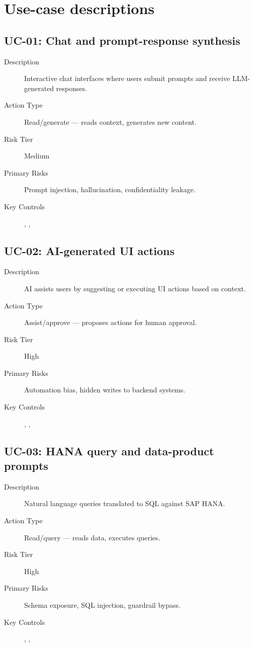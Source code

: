 \section{Use-case descriptions}

\subsection{UC-01: Chat and prompt-response synthesis}

\begin{description}
  \item[Description] Interactive chat interfaces where users submit prompts and
        receive LLM-generated responses.
  \item[Action Type] Read/generate --- reads context, generates new content.
  \item[Risk Tier] Medium
  \item[Primary Risks] Prompt injection, hallucination, confidentiality leakage.
  \item[Key Controls] , , 
\end{description}

\subsection{UC-02: AI-generated UI actions}

\begin{description}
  \item[Description] AI assists users by suggesting or executing UI actions
        based on context.
  \item[Action Type] Assist/approve --- proposes actions for human approval.
  \item[Risk Tier] High
  \item[Primary Risks] Automation bias, hidden writes to backend systems.
  \item[Key Controls] , , 
\end{description}

\subsection{UC-03: HANA query and data-product prompts}

\begin{description}
  \item[Description] Natural language queries translated to SQL against SAP HANA.
  \item[Action Type] Read/query --- reads data, executes queries.
  \item[Risk Tier] High
  \item[Primary Risks] Schema exposure, SQL injection, guardrail bypass.
  \item[Key Controls] , , 
\end{description}

